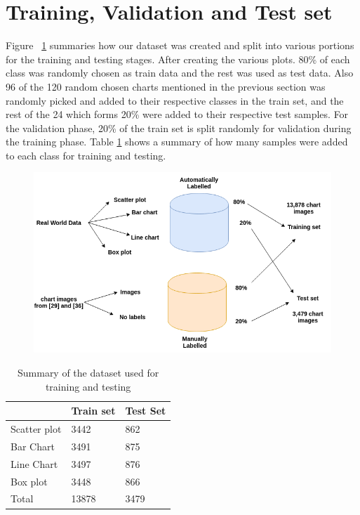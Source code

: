 \documentclass[12pt, a4paper,oneside]{report}
\begin{document}
\section{Training, Validation and Test set}
Figure ~\ref{fig:approach} summaries how our dataset was created and split into various portions for the training and testing stages. After creating the various plots. 80\% of each class was randomly chosen as train data and the rest was used as test data.
Also 96 of the 120 random chosen charts mentioned in the previous section was randomly picked and added to their respective classes in the train set, and the rest of the 24 which forms 20\% were added to their respective test samples.
For the validation phase, 20\% of the train set is split randomly for validation during the training phase. 
Table \ref{table:chart summary} shows a summary of how many samples were added to each class for training and testing.

\begin{figure}[!htbp]
	\includegraphics [scale=0.5] {approach}
	\label{fig:approach}
\end{figure}


\begin{table}[!htbp]
	\centering {} \small
	
	\begin{adjustbox}{max width=1.1\textwidth,center}
		\begin{tabular}{|p{5cm}|p{5cm}|p{5cm}|}
			\hline						
			&Train set&Test Set  \\ \hline	 
			Scatter plot & 3442 & 862  \\ \hline
			Bar Chart & 3491 & 875 \\ \hline
			Line Chart & 3497 & 876 \\ \hline
			Box plot & 3448 &  866\\ \hline	
			Total & 13878 &  3479 \\ \hline		
		\end{tabular}
		
	\end{adjustbox}
	\caption {Summary of the dataset used for training and testing}	
	\label{table:chart summary}
\end{table}
\end{document}
